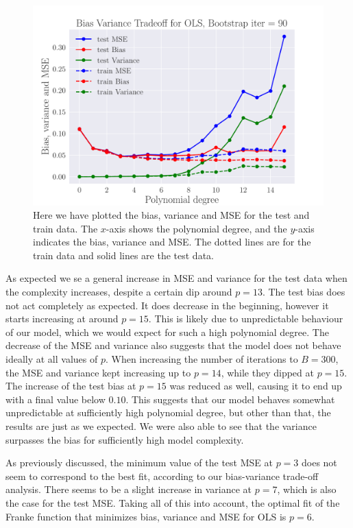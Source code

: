 \documentclass[reprint,english,notitlepage,aps,nobalancelastpage,nofootinbib]{revtex4-1}  %
\begin{document}
\begin{figure}[h]
	\includegraphics[width=\linewidth]{BVT_OLS_n30_eps0_2.pdf}
	\caption{Here we have plotted the bias, variance and MSE for the test and train data. The $x$-axis shows the polynomial degree, and the $y$-axis indicates the bias, variance and MSE. The dotted lines are for the train data and solid lines are the test data.}\label{fig:BV_OLS}
\end{figure}

As expected we se a general increase in MSE and variance for the test data when the complexity increases, despite a certain dip around $p=13$. The test bias does not act completely as expected. It does decrease in the beginning, however it starts increasing at around $p = 15$. This is likely due to unpredictable behaviour of our model, which we would expect for such a high polynomial degree. The decrease of the MSE and variance also suggests that the model does not behave ideally at all values of $p$. When increasing the number of iterations to $B=300$, the MSE and variance kept increasing up to $p=14$, while they dipped at $p=15$. The increase of the test bias at $p=15$ was reduced as well, causing it to end up with a final value below $0.10$. This suggests that our model behaves somewhat unpredictable at sufficiently high polynomial degree, but other than that, the results are just as we expected. We were also able to see that the variance surpasses the bias for sufficiently high model complexity.

As previously discussed, the minimum value of the test MSE at $p=3$ does not seem to correspond to the best fit, according to our bias-variance trade-off analysis. There seems to be a slight increase in variance at $p=7$, which is also the case for the test MSE. Taking all of this into account, the optimal fit of the Franke function that minimizes bias, variance and MSE for OLS is $p=6$.
\end{document}
